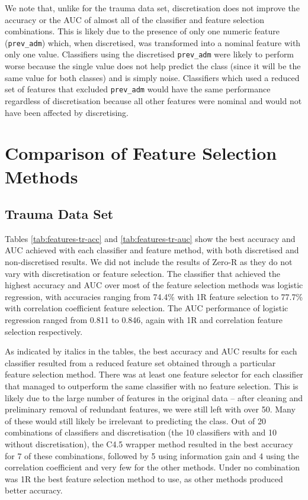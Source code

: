 We note that, unlike for the trauma data set, discretisation does not improve
the accuracy or the AUC of almost all of the classifier and feature selection
combinations. This is likely due to the presence of only one numeric feature
(\texttt{prev\_adm}) which, when discretised, was transformed into a nominal
feature with only one value. Classifiers using the discretised
\texttt{prev\_adm} were likely to perform worse because the single value does
not help predict the class (since it will be the same value for both classes)
and is simply noise. Classifiers which used a reduced set of features that
excluded \texttt{prev\_adm} would have the same performance regardless of
discretisation because all other features were nominal and would not have been
affected by discretising.

\section{Comparison of Feature Selection Methods}
\subsection{Trauma Data Set}
Tables \ref{tab:features-tr-acc} and \ref{tab:features-tr-auc} show the
best accuracy and AUC achieved with each classifier and feature method, with
both discretised and non-discretised results. We did not include the results of
Zero-R as they do not vary with discretisation or feature selection.
The classifier that achieved the
highest accuracy and AUC over most of the feature selection methods was
logistic regression, with accuracies ranging from 74.4\% with 1R feature
selection to 77.7\% with correlation coefficient feature selection. The AUC
performance of logistic regression ranged from 0.811 to 0.846, again with
1R and correlation feature selection respectively.



As indicated by italics in the tables, the best accuracy and AUC results for
each classifier resulted from a reduced feature set obtained through a
particular feature selection method. There was at least one feature selector
for each classifier that managed to outperform the same classifier with
no feature selection. This is likely due to the large number of features in
the original data -- after cleaning and preliminary removal of redundant
features, we were still left with over 50. Many of these would still likely
be irrelevant to predicting the class.
Out of 20 combinations of classifiers
and discretisation (the 10 classifiers with and 10 without
discretisation), the C4.5 wrapper method resulted in the best
accuracy for 7 of these combinations, followed by 5 using information gain
and 4 using the correlation coefficient and very few for the other methods.
Under no combination was 1R the best feature selection method to use, as other
methods produced better accuracy.

